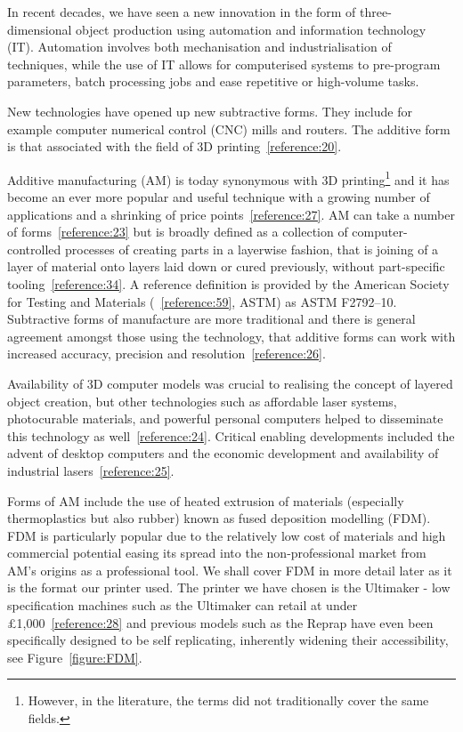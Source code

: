\documentclass[11pt]{report} %
\begin{document}
In recent decades, we have seen a new innovation in the form of three-dimensional object production using automation and information technology (IT). Automation involves both mechanisation and industrialisation of techniques, while the use of IT allows for computerised systems to pre-program parameters, batch processing jobs and ease repetitive or high-volume tasks.

New technologies have opened up new subtractive forms. They include for example computer numerical control (CNC) mills and routers. The additive form is that associated with the field of 3D printing~\ref{reference:20}. 

Additive manufacturing (AM) is today synonymous with 3D printing\footnote{However, in the literature, the terms did not traditionally cover the same fields.} and it has become an ever more popular and useful technique with a growing number of applications and a shrinking of price points~\ref{reference:27}. AM can take a number of forms~\ref{reference:23} but is broadly defined as a collection of computer-controlled processes of creating parts in a layerwise fashion, that is joining of a layer of material onto layers laid down or cured previously, without part-specific tooling~\ref{reference:34}. A reference definition is provided by the American Society for Testing and Materials (~\ref{reference:59}, ASTM) as ASTM F2792–10. Subtractive forms of manufacture are more traditional and there is general agreement amongst those using the technology, that additive forms can work with increased accuracy, precision and resolution~\ref{reference:26}.

Availability of 3D computer models was crucial to realising the concept of layered object creation, but other technologies such as affordable laser systems, photocurable materials, and powerful personal computers helped to disseminate this technology as well~\ref{reference:24}. Critical enabling developments included the advent of desktop computers and the economic development and availability of industrial lasers~\ref{reference:25}.

Forms of AM include the use of heated extrusion of materials (especially thermoplastics but also rubber) known as fused deposition modelling (FDM). FDM is particularly popular due to the relatively low cost of materials and high commercial potential easing its spread into the non-professional market from AM's origins as a professional tool. We shall cover FDM in more detail later as it is the format our printer used. The printer we have chosen is the Ultimaker - low specification machines such as the Ultimaker can retail at under £1,000~\ref{reference:28} and previous models such as the Reprap have even been specifically designed to be self replicating, inherently widening their accessibility, see Figure~\ref{figure:FDM}.
\end{document}
